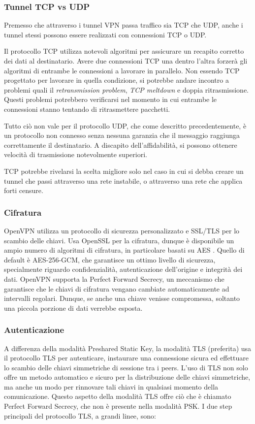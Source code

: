 \subsubsection{Tunnel TCP vs UDP}
Premesso che attraverso i tunnel VPN passa traffico sia TCP che UDP, anche i tunnel stessi possono essere realizzati con connessioni TCP o UDP.

Il protocollo TCP utilizza notevoli algoritmi per assicurare un recapito corretto dei dati al destinatario. Avere due connessioni TCP una dentro l'altra forzerà gli algoritmi di entrambe le connessioni a lavorare in parallelo. Non essendo TCP progettato per lavorare in quella condizione, si potrebbe andare incontro a problemi quali il \emph{retransmission problem}, \emph{TCP meltdown} e doppia ritrasmissione. Questi problemi potrebbero verificarsi nel momento in cui entrambe le connessioni stanno tentando di ritrasmettere pacchetti.

Tutto ciò non vale per il protocollo UDP, che come descritto precedentemente, è un protocollo non connesso senza nessuna garanzia che il messaggio raggiunga correttamente il destinatario. A discapito dell'affidabilità, si possono ottenere velocità di trasmissione notevolmente superiori.

TCP potrebbe rivelarsi la scelta migliore solo nel caso in cui si debba creare un tunnel che passi attraverso una rete instabile, o attraverso una rete che applica forti censure.

\subsubsection{Cifratura}
OpenVPN utilizza un protocollo di sicurezza personalizzato e SSL/TLS per lo scambio delle chiavi. Usa OpenSSL per la cifratura, dunque è disponibile un ampio numero di algoritmi di cifratura, in particolare basati su AES \cite[RFC3826]{RFC3826}. Quello di default è AES-256-GCM, che garantisce un ottimo livello di sicurezza, specialmente riguardo confidenzialità, autenticazione dell'origine e integrità dei dati.
OpenVPN supporta la Perfect Forward Secrecy, un meccanismo che garantisce che le chiavi di cifratura vengano cambiate automaticamente ad intervalli regolari. Dunque, se anche una chiave venisse compromessa, soltanto una piccola porzione di dati verrebbe esposta.

\subsubsection{Autenticazione}
A differenza della modalità Preshared Static Key, la modalità TLS (preferita) usa il protocollo TLS per autenticare, instaurare una connessione sicura ed effettuare lo scambio delle chiavi simmetriche di sessione tra i peers. L'uso di TLS non solo offre un metodo automatico e sicuro per la distribuzione delle chiavi simmetriche, ma anche un modo per rinnovare tali chiavi in qualsiasi momento della comunicazione.
Questo aspetto della modalità TLS offre ciò che è chiamato Perfect Forward Secrecy, che non è presente nella modalità PSK.
I due step principali del protocollo TLS, a grandi linee, sono:

